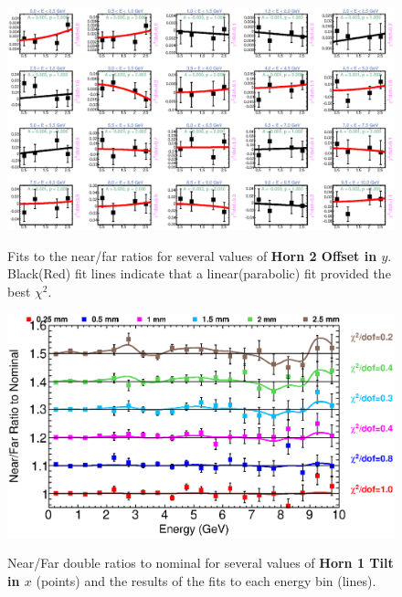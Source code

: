 \begin{figure}[ht]
  \begin{center}
    {\includegraphics[width=5.0in]{figures/Horn2YOffset_nof_fits.eps}}
  \end{center}
\caption{ Fits to the near/far ratios for several values of {\bf Horn 2 Offset in $y$}. Black(Red) fit lines indicate that a linear(parabolic) fit provided the best $\chi^2$. }
\end{figure}

\begin{figure}[ht]
  \begin{center}
    {\includegraphics[width=6.0in]{figures/Horn1XTilt_nof_summary.eps}}
  \end{center}
\caption{ Near/Far double ratios to nominal for several values of {\bf Horn 1 Tilt in $x$} (points) and the results of the fits to each energy bin (lines).}
\end{figure}

